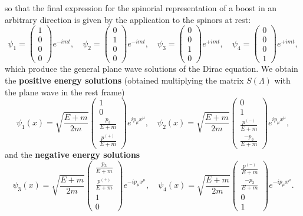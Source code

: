 so that the final expression for the spinorial representation of a boost in an arbitrary direction is given by the application to the spinors at rest:
\[
    \psi_1 = \begin{pmatrix}
        1 \\
        0 \\
        0 \\
        0
    \end{pmatrix} e^{-imt}, \quad \psi_2 = \begin{pmatrix}
        0 \\
        1 \\
        0 \\
        0
    \end{pmatrix} e^{-imt}, \quad \psi_3 = \begin{pmatrix}
        0 \\
        0 \\
        1 \\
        0
    \end{pmatrix} e^{+imt}, \quad \psi_4 = \begin{pmatrix}
        0 \\
        0 \\
        0 \\
        1
    \end{pmatrix} e^{+imt},
\]
which produce the general plane wave solutions of the Dirac equation. We obtain the \textbf{positive energy solutions} (obtained multiplying the matrix \(S(\Lambda)\) with the plane wave in the rest frame)
\[
    \psi_1 (x) = \sqrt{\frac{E + m}{2m}} \begin{pmatrix}
        1                  \\
        0                  \\
        \tfrac{p_3}{E + m} \\
        \tfrac{p^{(+)}}{E + m}
    \end{pmatrix} e^{i p_{\mu} x^{\mu}}, \quad \psi_2 (x) = \sqrt{\frac{E + m}{2m}} \begin{pmatrix}
        0                      \\
        1                      \\
        \tfrac{p^{(-)}}{E + m} \\
        \tfrac{-p_3}{E + m}
    \end{pmatrix} e^{i p_{\mu} x^{\mu}},
\]
and the \textbf{negative energy solutions}
\[
    \psi_3 (x) = \sqrt{\frac{E + m}{2m}} \begin{pmatrix}
        \tfrac{p_3}{E + m}     \\
        \tfrac{p^{(+)}}{E + m} \\
        1                      \\
        0
    \end{pmatrix} e^{-i p_{\mu} x^{\mu}}, \quad \psi_4 (x) = \sqrt{\frac{E + m}{2m}} \begin{pmatrix}
        \tfrac{p^{(-)}}{E + m} \\
        \tfrac{-p_3}{E + m}    \\
        0                      \\
        1
    \end{pmatrix} e^{-i p_{\mu} x^{\mu}}.
\]
